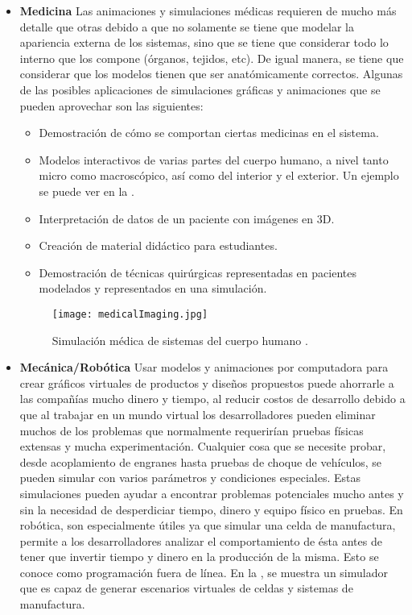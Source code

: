 \begin{itemize}
	\item \textbf{Medicina}
Las animaciones y simulaciones médicas requieren de mucho más detalle que otras debido a que no solamente se tiene que modelar la apariencia externa de los sistemas, sino que se tiene que considerar todo lo interno que los compone (órganos, tejidos, etc). De igual manera, se tiene que considerar que los modelos tienen que ser anatómicamente correctos. Algunas de las posibles aplicaciones de simulaciones gráficas y animaciones que se pueden aprovechar son las siguientes:

	\begin{itemize}
		\item Demostración de cómo se comportan ciertas medicinas en el sistema.
		\item Modelos interactivos de varias partes del cuerpo humano, a nivel tanto micro como macroscópico, así como del interior y el exterior. Un ejemplo se puede ver en la .
		\item Interpretación de datos de un paciente con imágenes en 3D.
		\item Creación de material didáctico para estudiantes.
		\item Demostración de técnicas quirúrgicas representadas en pacientes modelados y representados en una simulación.
	\end{itemize}

\begin{figure}[!ht]
	\centering
		\texttt{[image: medicalImaging.jpg]}
	\caption[Simulación médica gráfica.]{Simulación médica de sistemas del cuerpo humano \citep{medicalImaging}.}
	\label{fig:medicalImaging}
\end{figure}

	\item \textbf{Mecánica/Robótica}
Usar modelos y animaciones por computadora para crear gráficos virtuales de productos y diseños propuestos puede ahorrarle a las compañías mucho dinero y tiempo, al reducir costos de desarrollo debido a que al trabajar en un mundo virtual los desarrolladores pueden eliminar muchos de los problemas que normalmente requerirían pruebas físicas extensas y mucha experimentación. Cualquier cosa que se necesite probar, desde acoplamiento de engranes hasta pruebas de choque de vehículos, se pueden simular con varios parámetros y condiciones especiales. Estas simulaciones pueden ayudar a encontrar problemas potenciales mucho antes y sin la necesidad de desperdiciar tiempo, dinero y equipo físico en pruebas. En robótica, son especialmente útiles ya que simular una celda de manufactura, permite a los desarrolladores analizar el comportamiento de ésta antes de tener que invertir tiempo y dinero en la producción de la misma. Esto se conoce como programación fuera de línea. En la , se muestra un simulador que es capaz de generar escenarios virtuales de celdas y sistemas de manufactura.


\end{itemize}
